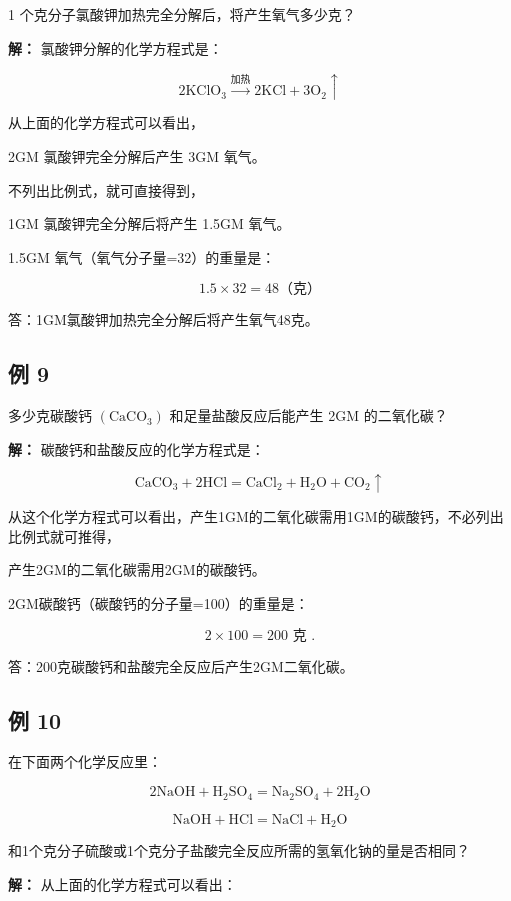 1 个克分子氯酸钾加热完全分解后，将产生氧气多少克？

\textbf{解：} 氯酸钾分解的化学方程式是：

\[
2 \mathrm{KClO}_{3} \xrightarrow {\text{加热}} 2 \mathrm{KCl} + 3 \mathrm{O}_{2} \uparrow
\]

从上面的化学方程式可以看出，

2GM 氯酸钾完全分解后产生 3GM 氧气。

不列出比例式，就可直接得到，

1GM 氯酸钾完全分解后将产生 1.5GM 氧气。

1.5GM 氧气（氧气分子量=32）的重量是：

\[
1.5\times32=48\text{（克）}
\]

答：1GM氯酸钾加热完全分解后将产生氧气48克。

\subsection{例 9}

多少克碳酸钙 \(\left(\mathrm{CaCO}_{3}\right)\) 和足量盐酸反应后能产生
2GM 的二氧化碳？

\textbf{解：} 碳酸钙和盐酸反应的化学方程式是：

\[
\mathrm{CaCO}_{3} + 2 \mathrm{HCl} = \mathrm{CaCl}_{2} + \mathrm{H}_{2} \mathrm{O} + \mathrm{CO}_{2} \uparrow
\]

从这个化学方程式可以看出，产生1GM的二氧化碳需用1GM的碳酸钙，不必列出比例式就可推得，

产生2GM的二氧化碳需用2GM的碳酸钙。

2GM碳酸钙（碳酸钙的分子量=100）的重量是：

\[
2 \times 100 = 200 \text{ 克 }.
\]

答：200克碳酸钙和盐酸完全反应后产生2GM二氧化碳。

\subsection{例 10}

在下面两个化学反应里：

\[
2 \mathrm{NaOH} + \mathrm{H}_{2} \mathrm{SO}_{4} = \mathrm{Na}_{2} \mathrm{SO}_{4} + 2 \mathrm{H}_{2} \mathrm{O}
\]

\[
\mathrm{NaOH} + \mathrm{HCl} = \mathrm{NaCl} + \mathrm{H}_{2} \mathrm{O}
\]

和1个克分子硫酸或1个克分子盐酸完全反应所需的氢氧化钠的量是否相同？

\textbf{解：} 从上面的化学方程式可以看出：

